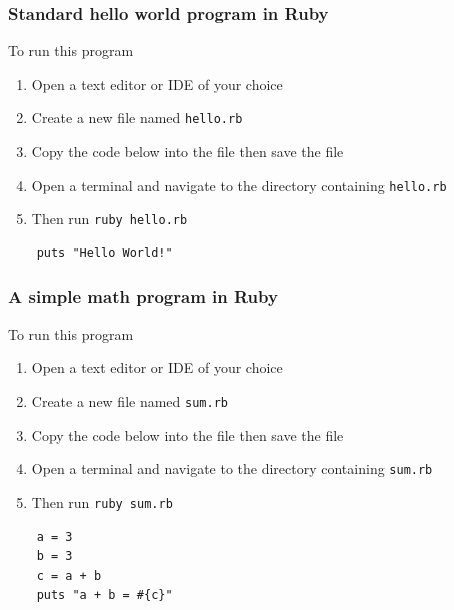 \documentclass{article}
\begin{document}
  \subsubsection{Standard hello world program in Ruby}
  To run this program
  \begin{enumerate}
    \item Open a text editor or IDE of your choice
    \item Create a new file named \verb|hello.rb|
    \item Copy the code below into the file then save the file
    \item Open a terminal and navigate to the directory containing \verb|hello.rb|
    \item Then run \verb|ruby hello.rb|
  \end{enumerate}
  \begin{lstlisting}
    puts "Hello World!"
  \end{lstlisting}

  \subsubsection{A simple math program in Ruby}
  To run this program
  \begin{enumerate}
    \item Open a text editor or IDE of your choice
    \item Create a new file named \verb|sum.rb|
    \item Copy the code below into the file then save the file
    \item Open a terminal and navigate to the directory containing \verb|sum.rb|
    \item Then run \verb|ruby sum.rb|
  \end{enumerate}
  \begin{lstlisting}
    a = 3
    b = 3
    c = a + b
    puts "a + b = #{c}"
  \end{lstlisting}
\end{document}
